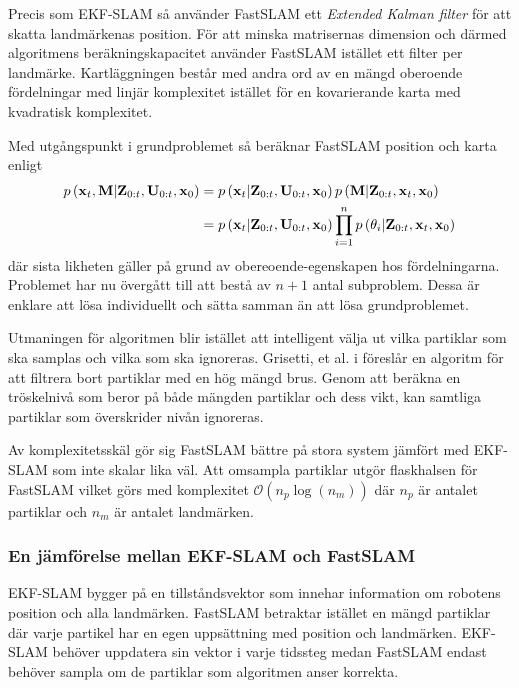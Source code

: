 \documentclass[11pt]{article}
\newcommand{\bfr}[1]{\textbf{\textrm{{#1}}}}
\begin{document}
\begin{flushleft}
Precis som EKF-SLAM så använder FastSLAM ett \emph{Extended Kalman filter} för att skatta landmärkenas position. För att minska matrisernas dimension och därmed algoritmens beräkningskapacitet använder FastSLAM istället ett filter per landmärke. Kartläggningen består med andra ord av en mängd oberoende fördelningar med linjär komplexitet istället för en kovarierande karta med kvadratisk komplexitet.

Med utgångspunkt i grundproblemet så beräknar FastSLAM position och karta enligt
\begin{align*}
	p\left(\textbf{\textrm{x}}_{t},\textbf{\textrm{M}} \vert \textbf{\textrm{Z}}_{0:t}, \textbf{\textrm{U}}_{0:t}, \textbf{\textrm{x}}_0 \right) &= p\left(\textbf{\textrm{x}}_{t}\vert \textbf{\textrm{Z}}_{0:t}, \textbf{\textrm{U}}_{0:t}, \textbf{\textrm{x}}_0 \right)p\left(\textbf{\textrm{M}} \vert \textbf{\textrm{Z}}_{0:t}, \bfr{x}_{t}, \textbf{\textrm{x}}_0 \right) \\
	&= p\left(\textbf{\textrm{x}}_{t}\vert \textbf{\textrm{Z}}_{0:t}, \textbf{\textrm{U}}_{0:t}, \textbf{\textrm{x}}_0 \right)\prod_{i=1}^{n} p\left(\theta_{i} \vert \textbf{\textrm{Z}}_{0:t}, \bfr{x}_{t}, \textbf{\textrm{x}}_0 \right)
\end{align*}
där sista likheten gäller på grund av obereoende-egenskapen hos fördelningarna. Problemet har nu övergått till att bestå av $n + 1$ antal subproblem. Dessa är enklare att lösa individuellt och sätta samman än att lösa grundproblemet.

Utmaningen för algoritmen blir istället att intelligent välja ut vilka partiklar som ska samplas och vilka som ska ignoreras. Grisetti, et al. i \cite{reo} föreslår en algoritm för att filtrera bort partiklar med en hög mängd brus. Genom att beräkna en tröskelnivå som beror på både mängden partiklar och dess vikt, kan samtliga partiklar som överskrider nivån ignoreras. 

Av komplexitetsskäl gör sig FastSLAM bättre på stora system jämfört med EKF-SLAM som inte skalar lika väl. Att omsampla partiklar utgör flaskhalsen för FastSLAM vilket görs med komplexitet $\mathcal{O}\left(n_{p}\log\left(n_{m}\right)\right)$ där $n_p$ är antalet partiklar och $n_m$ är antalet landmärken.

\subsubsection{En jämförelse mellan EKF-SLAM och FastSLAM}
EKF-SLAM bygger på en tillståndsvektor som innehar information om robotens position och alla landmärken. FastSLAM betraktar istället en mängd partiklar där varje partikel har en egen uppsättning med position och landmärken. EKF-SLAM behöver uppdatera sin vektor i varje tidssteg medan FastSLAM endast behöver sampla om de partiklar som algoritmen anser korrekta. 


\end{flushleft}
\end{document}
